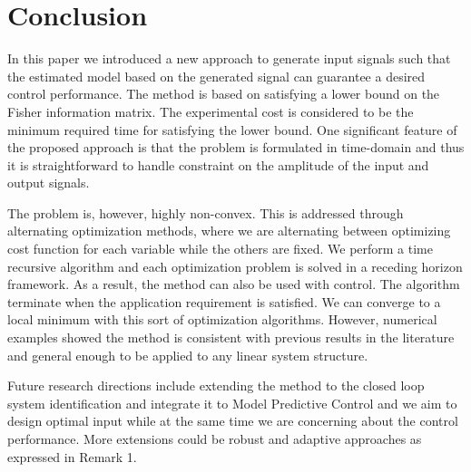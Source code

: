 \documentclass{ifacconf}
\begin{document}
\section{Conclusion}
\label{sec:conclusion}
In this paper we introduced a new approach to generate input signals such that the estimated model based on the generated signal can guarantee a desired control performance. The method is based on satisfying a lower bound on the Fisher information matrix. The experimental cost is considered to be the minimum required time for satisfying the lower bound. One significant feature of the proposed approach is that the problem is formulated in time-domain and thus it is straightforward to handle constraint on the amplitude of the input and output signals. 

The problem is, however, highly non-convex. This is addressed through alternating optimization methods, where we are alternating between optimizing cost function for each variable while the others are fixed. We perform a time recursive algorithm and each optimization problem is solved in a receding horizon framework. As a result, the method can also be used with control. The algorithm terminate when the application requirement is satisfied. We can converge to a local minimum with this sort of optimization algorithms. However, numerical examples showed the method is consistent with previous results in the literature and general enough to be applied to any linear system structure.

Future research directions include extending the method to the closed loop system identification and integrate it to Model Predictive Control and we aim to design optimal input while at the same time we are concerning about the control performance. More extensions could be robust and adaptive approaches as expressed in Remark 1.




\end{document}
